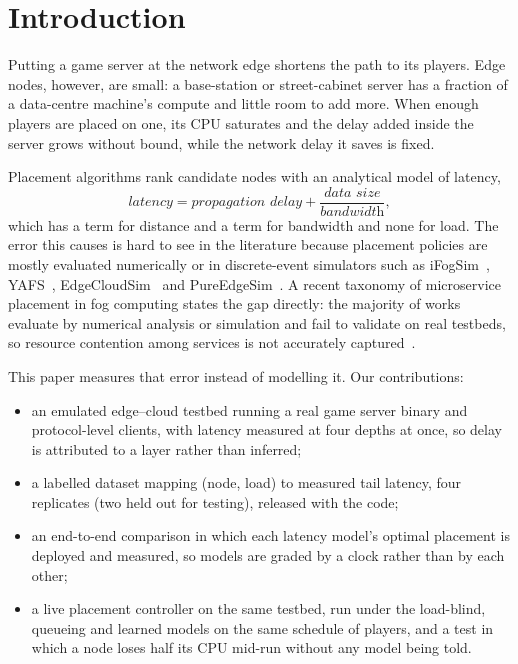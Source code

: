 \documentclass[conference]{IEEEtran}
\begin{document}
\section{Introduction}

Putting a game server at the network edge shortens the path to its players.
Edge nodes, however, are small: a base-station or street-cabinet server has a
fraction of a data-centre machine's compute and little room to add more. When enough
players are placed on one, its CPU saturates and the delay added inside the
server grows without bound, while the network delay it saves is fixed.

Placement algorithms rank candidate nodes with an analytical model of latency,
\begin{equation}
  \textit{latency} = \textit{propagation delay} + \frac{\textit{data size}}{\textit{bandwidth}},
  \label{eq:analytical}
\end{equation}
which has a term for distance and a term for bandwidth and none for load. The
error this causes is hard to see in the literature because placement policies
are mostly evaluated numerically or in discrete-event simulators such as
iFogSim~\cite{gupta2017ifogsim}, YAFS~\cite{lera2019yafs},
EdgeCloudSim~\cite{sonmez2018edgecloudsim} and
PureEdgeSim~\cite{mechalikh2021pureedgesim}. A recent taxonomy of microservice
placement in fog computing states the gap directly: the majority of works
evaluate by numerical analysis or simulation and fail to validate on real
testbeds, so resource contention among services is not accurately
captured~\cite{pallewatta2023taxonomy}.

This paper measures that error instead of modelling it. Our contributions:
\begin{itemize}
  \item an emulated edge--cloud testbed running a real game server binary and
        protocol-level clients, with latency measured at four depths at once,
        so delay is attributed to a layer rather than inferred;
  \item a labelled dataset mapping (node, load) to measured tail latency,
        four replicates (two held out for testing), released with the code;
  \item an end-to-end comparison in which each latency model's optimal
        placement is deployed and measured, so models are graded by a clock
        rather than by each other;
  \item a live placement controller on the same testbed, run under the
        load-blind, queueing and learned models on the same schedule of
        players, and a test in which a node loses half its CPU mid-run
        without any model being told.
\end{itemize}
\end{document}

